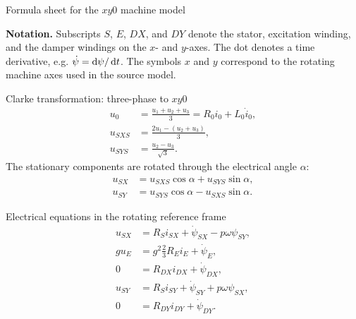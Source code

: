 
%
{Formula sheet for the $xy0$ machine model}
\begin{noteBox}
	\textbf{Notation.} Subscripts $S$, $E$, $DX$, and $DY$ denote the stator,
	excitation winding, and the damper windings on the $x$- and $y$-axes.
	The dot denotes a time derivative, e.g. $\dot\psi=\mathop{}\!\mathrm{d}\psi/\mathop{}\!\mathrm{d} t$.
	The symbols $x$ and $y$ correspond to the rotating machine axes used in the
	source model.
\end{noteBox}

\begin{formulaBox}{Clarke transformation: three-phase to $xy0$}
	\begin{align}
		u_0   &= \frac{u_1+u_2+u_3}{3}
		= R_0 i_0 + L_0\dot i_0, \\
		u_{SXS} &= \frac{2u_1-(u_2+u_3)}{3}, \\
		u_{SYS} &= \frac{u_2-u_3}{\sqrt{3}}.
	\end{align}
	The stationary components are rotated through the electrical angle $\alpha$:
	\begin{align}
		u_{SX} &= u_{SXS}\cos\alpha + u_{SYS}\sin\alpha, \\
		u_{SY} &= u_{SYS}\cos\alpha - u_{SXS}\sin\alpha.
	\end{align}
\end{formulaBox}

\begin{formulaBox}{Electrical equations in the rotating reference frame}
	\begin{align}
		u_{SX} &= R_S i_{SX}+\dot\psi_{SX}-p\omega\psi_{SY}, \\
		g u_E  &= g^2\frac{2}{3}R_E i_E+\dot\psi_E, \\
		0      &= R_{DX}i_{DX}+\dot\psi_{DX}, \\
		u_{SY} &= R_S i_{SY}+\dot\psi_{SY}+p\omega\psi_{SX}, \\
		0      &= R_{DY}i_{DY}+\dot\psi_{DY}.
	\end{align}
\end{formulaBox}

\newpage
\thispagestyle{scrheadings}

